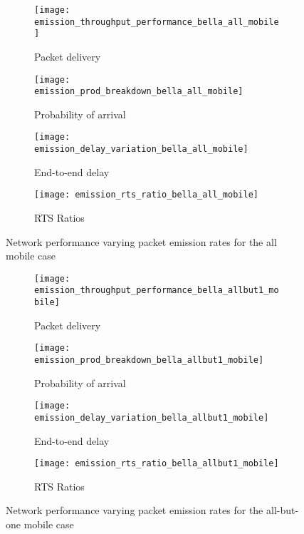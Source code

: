 \begin{figure}[bp!]
	\begin{subfigure}[t]{0.5\textwidth}
		\centering
		\texttt{[image: emission\_throughput\_performance\_bella\_all\_mobile]}
		\caption{Packet delivery}
		\label{fig:emission_throughput_performance_bella_all_mobile}
	\end{subfigure}
	\begin{subfigure}[t]{0.5\textwidth}
		\centering
		\texttt{[image: emission\_prod\_breakdown\_bella\_all\_mobile]}
		\caption{Probability of arrival}
		\label{fig:emission_prod_breakdown_bella_all_mobile}
	\end{subfigure}
	
	\begin{subfigure}[t]{0.5\textwidth}
		\centering
		\texttt{[image: emission\_delay\_variation\_bella\_all\_mobile]}
		\caption{End-to-end delay}
		\label{fig:emission_delay_variation_bella_all_mobile}
	\end{subfigure}
	\begin{subfigure}[t]{0.5\textwidth}
		\centering
		\texttt{[image: emission\_rts\_ratio\_bella\_all\_mobile]}
		\caption{RTS Ratios}
		\label{fig:emission_rts_ratio_bella_all_mobile}
	\end{subfigure}
	\caption{Network performance varying packet emission rates for the all mobile case}
	\label{fig:emission_bella_all_mobile}
\end{figure}


\begin{figure}[tp!]
	\begin{subfigure}[t]{0.5\textwidth}
		\centering
		\texttt{[image: emission\_throughput\_performance\_bella\_allbut1\_mobile]}
		\caption{Packet delivery}
		\label{fig:emission_throughput_performance_bella_allbut1_mobile}
	\end{subfigure}
	\begin{subfigure}[t]{0.5\textwidth}
		\centering
		\texttt{[image: emission\_prod\_breakdown\_bella\_allbut1\_mobile]}
		\caption{Probability of arrival}
		\label{fig:emission_prod_breakdown_bella_allbut1_mobile}
	\end{subfigure}
	
	\begin{subfigure}[t]{0.5\textwidth}
		\centering
		\texttt{[image: emission\_delay\_variation\_bella\_allbut1\_mobile]}
		\caption{End-to-end delay}
		\label{fig:emission_delay_variation_bella_allbut1_mobile}
	\end{subfigure}
	\begin{subfigure}[t]{0.5\textwidth}
		\centering
		\texttt{[image: emission\_rts\_ratio\_bella\_allbut1\_mobile]}
		\caption{RTS Ratios}
		\label{fig:emission_rts_ratio_bella_allbut1_mobile}
	\end{subfigure}
	\caption{Network performance varying packet emission rates for the all-but-one mobile case}
	\label{fig:emission_bella_allbut1_mobile}
\end{figure}

